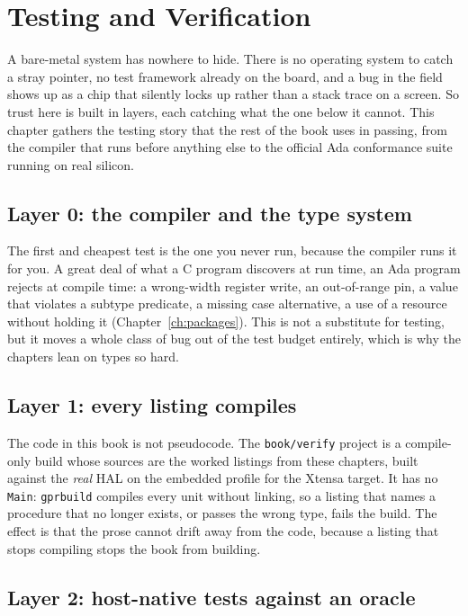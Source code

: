 \chapter{Testing and Verification}
\label{ch:testing}

A bare-metal system has nowhere to hide. There is no operating system to catch a
stray pointer, no test framework already on the board, and a bug in the field shows
up as a chip that silently locks up rather than a stack trace on a screen. So trust
here is built in layers, each catching what the one below it cannot. This chapter
gathers the testing story that the rest of the book uses in passing, from the
compiler that runs before anything else to the official Ada conformance suite
running on real silicon.

\section{Layer 0: the compiler and the type system}

The first and cheapest test is the one you never run, because the compiler runs it
for you. A great deal of what a C program discovers at run time, an Ada program
rejects at compile time: a wrong-width register write, an out-of-range pin, a value
that violates a subtype predicate, a missing case alternative, a use of a resource
without holding it (Chapter~\ref{ch:packages}). This is not a substitute for testing,
but it moves a whole class of bug out of the test budget entirely, which is why the
chapters lean on types so hard.

\section{Layer 1: every listing compiles}

The code in this book is not pseudocode. The \texttt{book/verify} project is a
compile-only build whose sources are the worked listings from these chapters, built
against the \emph{real} HAL on the embedded profile for the Xtensa target. It has no
\texttt{Main}: \texttt{gprbuild} compiles every unit without linking, so a listing
that names a procedure that no longer exists, or passes the wrong type, fails the
build. The effect is that the prose cannot drift away from the code, because a
listing that stops compiling stops the book from building.

\section{Layer 2: host-native tests against an oracle}

